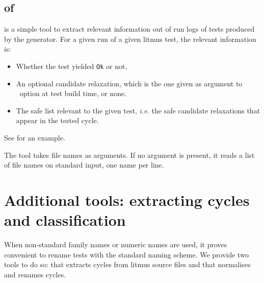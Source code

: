 \subsection{ of \readRelax}
\readRelax{} is a simple tool to extract relevant information
out of \litmus{} run logs of tests produced by the \diy{} generator.
For a given run of a given litmus test, the relevant information is:
\begin{itemize}
\item Whether the test yielded \texttt{Ok} or not,
\item An optional candidate relaxation, which is the one
given as argument to \diy~option
 at test build time, or none.
\item The safe list relevant to the given test, \emph{i.e.}
the safe candidate relaxations that appear in the tested cycle.
\end{itemize}
See \mysec{\ref{readRelax:intro}} for an example.

The tool \readRelax{} takes file names as arguments.
If no argument is present, it reads a list
of file names on standard input, one name per line.

\section{Additional tools: extracting cycles and classification}
When non-standard family names or numeric names are used, it proves convenient
to rename tests with the standard naming scheme.
We provide two tools to do so: \mcycles{} that extracts cycles from
litmus source files and \classify{} that normalises and renames cycles.

